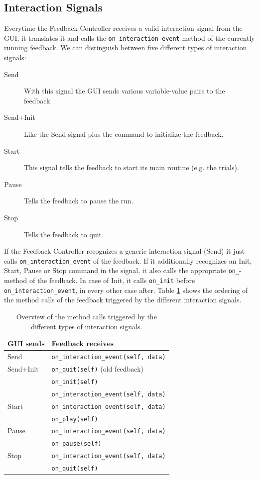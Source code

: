 \subsection{Interaction Signals}\label{sec:is}
Everytime the Feedback Controller receives a valid interaction signal from the GUI, it translates it and calls the \lstinline+on_interaction_event+ method of the currently running feedback. We can distinguish between five different types of interaction signals:
\begin{description}
\item[Send] With this signal the GUI sends various variable-value pairs to the feedback.
\item[Send+Init] Like the Send signal plus the command to initialize the feedback.
\item[Start] This signal tells the feedback to start its main routine (e.g. the trials).
\item[Pause] Tells the feedback to pause the run.
\item[Stop] Tells the feedback to quit.
\end{description}
If the Feedback Controller recognizes a generic interaction signal (Send) it just calls \lstinline+on_interaction_event+ of the feedback. If it additionally recognizes an Init, Start, Pause or Stop command in the signal, it also calls the appropriate \lstinline+on_+-method of the feedback. In case of Init, it calls \lstinline+on_init+ before \lstinline+on_interaction_event+, in every other case after. Table \ref{tab:is-triggers} shows the ordering of the method calls of the feedback triggered by the different interaction signals.
\begin{table}
\centering
\begin{tabular}{l||l}
\textbf{GUI sends} & \textbf{Feedback receives} \\
\hline\hline
Send & \lstinline+on_interaction_event(self, data)+\\
\hline
Send+Init & \lstinline+on_quit(self)+ (old feedback)\\ 
          & \lstinline+on_init(self)+ \\ 
          & \lstinline+on_interaction_event(self, data)+ \\ 
\hline
Start & \lstinline+on_interaction_event(self, data)+ \\ 
      & \lstinline+on_play(self)+ \\ 
\hline
Pause & \lstinline+on_interaction_event(self, data)+ \\ 
      & \lstinline+on_pause(self)+ \\ 
\hline
Stop & \lstinline+on_interaction_event(self, data)+ \\ 
     & \lstinline+on_quit(self)+
\end{tabular}
\caption{Overview of the method calls triggered by the different types of interaction signals.}\label{tab:is-triggers}
\end{table}

